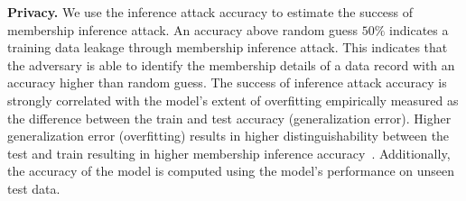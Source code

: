\noindent\textbf{Privacy.} We use the inference attack accuracy to estimate the success of membership inference attack.
An accuracy above random guess $50\%$ indicates a training data leakage through membership inference attack.
This indicates that the adversary is able to identify the membership details of a data record with an accuracy higher than random guess.
The success of inference attack accuracy is strongly correlated with the model's extent of overfitting empirically measured as the difference between the train and test accuracy (generalization error). Higher generalization error (overfitting) results in higher distinguishability between the test and train resulting in higher membership inference accuracy~\cite{shokri2017membership}.
Additionally, the accuracy of the model is computed using the model's performance on unseen test data.
